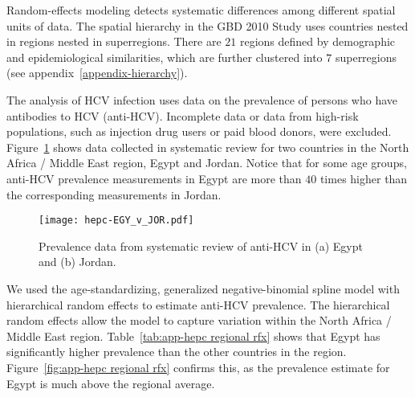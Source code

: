 Random-effects modeling detects systematic differences among different
spatial units of data.  The spatial hierarchy in the GBD
2010 Study uses countries nested in regions nested in superregions.
There are $21$ regions defined by demographic and epidemiological
similarities, which are further clustered into $7$ superregions (see appendix~\ref{appendix-hierarchy}).

The analysis of HCV infection uses data on the prevalence of persons who
have antibodies to HCV (anti-HCV).  Incomplete data or data from high-risk
populations, such as injection drug users or paid blood donors, were excluded.
Figure~\ref{fig:app-hepc data} shows data collected in systematic
review for two countries in the North Africa / Middle East region, Egypt
and Jordan.  Notice that for some age groups, anti-HCV prevalence
measurements in Egypt are more than $40$ times higher than the corresponding measurements in
Jordan.

    \begin{figure}[h]
        \begin{center}
            \texttt{[image: hepc-EGY\_v\_JOR.pdf]}
            \caption{Prevalence data from systematic review of
              anti-HCV in (a) Egypt and (b) Jordan.}
            \label{fig:app-hepc data}
        \end{center}
    \end{figure}

We used the age-standardizing, generalized negative-binomial spline
model with hierarchical random effects to estimate anti-HCV prevalence.  The
hierarchical random effects allow the model to capture variation
within the North Africa / Middle East region.
Table~\ref{tab:app-hepc regional rfx} shows that Egypt has significantly
higher prevalence than the other countries in the region.
Figure~\ref{fig:app-hepc regional rfx} confirms this, as the prevalence
estimate for Egypt is much above the regional average.

